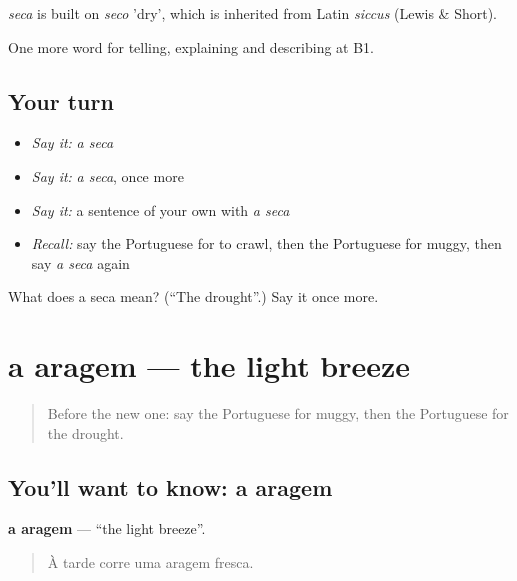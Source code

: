 \begin{cousinweb}
\emph{seca} is built on \emph{seco} 'dry', which is inherited from Latin \emph{siccus} (Lewis \& Short).
\end{cousinweb}

\begin{grammarlens}[title={What you've built}]
One more word for telling, explaining and describing at B1.
\end{grammarlens}

\subsection*{Your turn}
\begin{itemize}
\raggedright
  \item \emph{Say it:} \emph{a seca}
  \item \emph{Say it:} \emph{a seca}, once more
  \item \emph{Say it:} a sentence of your own with \emph{a seca}
  \item \emph{Recall:} say the Portuguese for to crawl, then the Portuguese for muggy, then say \emph{a seca} again
\end{itemize}

\begin{tcolorbox}[breakable,colback=teal!4,colframe=teal!35!black,title={Before you move on}]
What does a seca mean? (\textquotedblleft{}The drought\textquotedblright{}.) Say it once more.
\end{tcolorbox}
\section[a aragem]{a aragem — the light breeze}

\label{lesson:PT-C462-aragem}



\begin{quote}
Before the new one: say the Portuguese for muggy, then the Portuguese for the drought.
\end{quote}

\subsection*{You'll want to know: a aragem}
\textbf{a aragem} — \textquotedblleft{}the light breeze\textquotedblright{}.

\begin{quote}
À tarde corre uma aragem fresca.
\end{quote}

